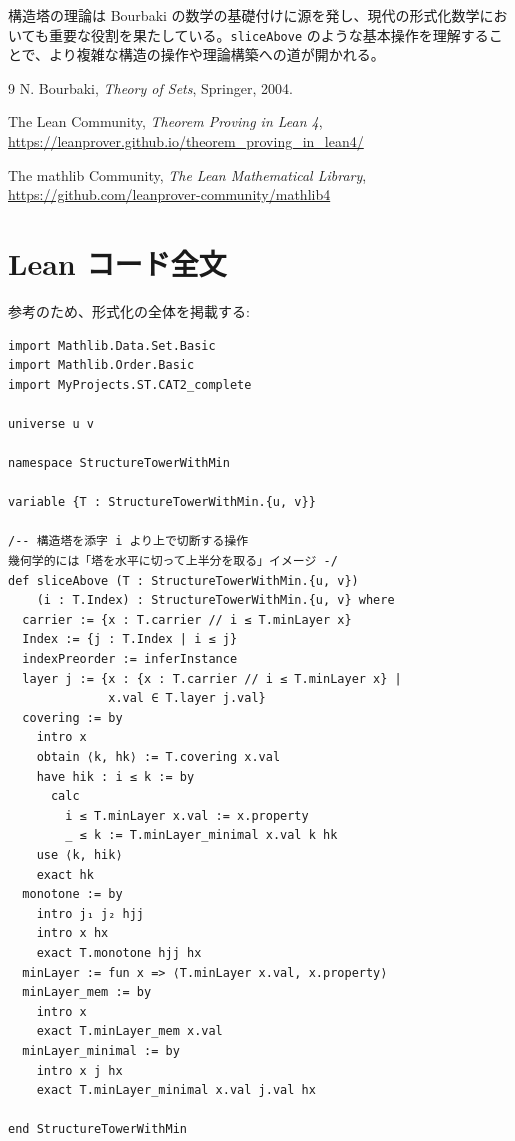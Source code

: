 \documentclass[a4paper,11pt]{article}
\theoremstyle{definition}
\begin{document}
構造塔の理論は Bourbaki の数学の基礎付けに源を発し、現代の形式化数学においても重要な役割を果たしている。\texttt{sliceAbove} のような基本操作を理解することで、より複雑な構造の操作や理論構築への道が開かれる。

\begin{thebibliography}{9}
N. Bourbaki, \textit{Theory of Sets}, Springer, 2004.

The Lean Community, \textit{Theorem Proving in Lean 4}, 
\url{https://leanprover.github.io/theorem_proving_in_lean4/}

The mathlib Community, \textit{The Lean Mathematical Library},
\url{https://github.com/leanprover-community/mathlib4}
\end{thebibliography}

\appendix
\section{Lean コード全文}

参考のため、形式化の全体を掲載する:

\begin{verbatim}
import Mathlib.Data.Set.Basic
import Mathlib.Order.Basic
import MyProjects.ST.CAT2_complete

universe u v

namespace StructureTowerWithMin

variable {T : StructureTowerWithMin.{u, v}}

/-- 構造塔を添字 i より上で切断する操作
幾何学的には「塔を水平に切って上半分を取る」イメージ -/
def sliceAbove (T : StructureTowerWithMin.{u, v}) 
    (i : T.Index) : StructureTowerWithMin.{u, v} where
  carrier := {x : T.carrier // i ≤ T.minLayer x}
  Index := {j : T.Index | i ≤ j}
  indexPreorder := inferInstance
  layer j := {x : {x : T.carrier // i ≤ T.minLayer x} | 
              x.val ∈ T.layer j.val}
  covering := by
    intro x
    obtain ⟨k, hk⟩ := T.covering x.val
    have hik : i ≤ k := by
      calc
        i ≤ T.minLayer x.val := x.property
        _ ≤ k := T.minLayer_minimal x.val k hk
    use ⟨k, hik⟩
    exact hk
  monotone := by
    intro j₁ j₂ hjj
    intro x hx
    exact T.monotone hjj hx
  minLayer := fun x => ⟨T.minLayer x.val, x.property⟩
  minLayer_mem := by
    intro x
    exact T.minLayer_mem x.val
  minLayer_minimal := by
    intro x j hx
    exact T.minLayer_minimal x.val j.val hx

end StructureTowerWithMin
\end{verbatim}
\end{document}

